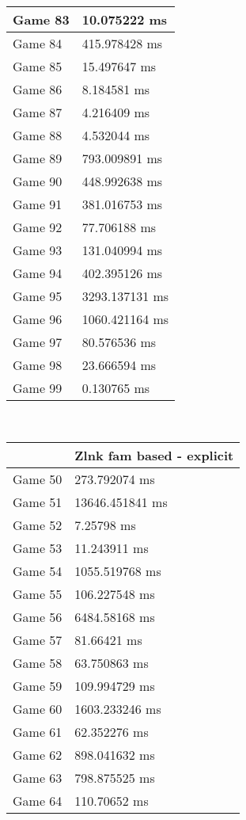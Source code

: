 \begin{multicols}{2}
\begin{tabular}{|l|l|}
	Game 83 & 10.075222 ms \\ \hline
	Game 84 & 415.978428 ms \\ \hline
	Game 85 & 15.497647 ms \\ \hline
	Game 86 & 8.184581 ms \\ \hline
	Game 87 & 4.216409 ms \\ \hline
	Game 88 & 4.532044 ms \\ \hline
	Game 89 & 793.009891 ms \\ \hline
	Game 90 & 448.992638 ms \\ \hline
	Game 91 & 381.016753 ms \\ \hline
	Game 92 & 77.706188 ms \\ \hline
	Game 93 & 131.040994 ms \\ \hline
	Game 94 & 402.395126 ms \\ \hline
	Game 95 & 3293.137131 ms \\ \hline
	Game 96 & 1060.421164 ms \\ \hline
	Game 97 & 80.576536 ms \\ \hline
	Game 98 & 23.666594 ms \\ \hline
	Game 99 & 0.130765 ms \\ \hline
\end{tabular}\\
\begin{tabular}{|l|l|}
	\hline
	& Zlnk fam based - explicit \\ \hline
	Game 50 & 273.792074 ms \\ \hline
	Game 51 & 13646.451841 ms \\ \hline
	Game 52 & 7.25798 ms \\ \hline
	Game 53 & 11.243911 ms \\ \hline
	Game 54 & 1055.519768 ms \\ \hline
	Game 55 & 106.227548 ms \\ \hline
	Game 56 & 6484.58168 ms \\ \hline
	Game 57 & 81.66421 ms \\ \hline
	Game 58 & 63.750863 ms \\ \hline
	Game 59 & 109.994729 ms \\ \hline
	Game 60 & 1603.233246 ms \\ \hline
	Game 61 & 62.352276 ms \\ \hline
	Game 62 & 898.041632 ms \\ \hline
	Game 63 & 798.875525 ms \\ \hline
	Game 64 & 110.70652 ms \\ \hline

\end{tabular}
\end{multicols}
